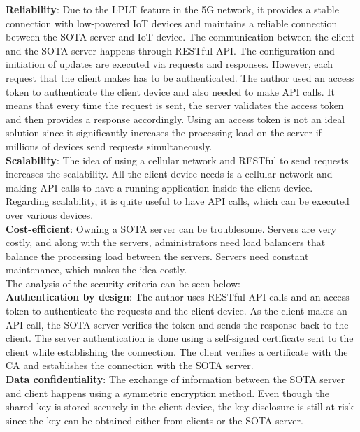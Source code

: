 \documentclass[12pt,a4paper]{article}
\begin{document}
{\textbf{Reliability}: Due to the LPLT feature in the 5G network, it provides a stable connection with low-powered IoT devices and maintains a reliable connection between the SOTA server and IoT device. The communication between the client and the SOTA server happens through RESTful API. The configuration and initiation of updates are executed via requests and responses. However, each request that the client makes has to be authenticated. The author used an access token to authenticate the client device and also needed to make API calls. It means that every time the request is sent, the server validates the access token and then provides a response accordingly. Using an access token is not an ideal solution since it significantly increases the processing load on the server if millions of devices send requests simultaneously. \cite{r28} \\

\textbf{Scalability}: The idea of using a cellular network and RESTful to send requests increases the scalability. All the client device needs is a cellular network and making API calls to have a running application inside the client device. Regarding scalability, it is quite useful to have API calls, which can be executed over various devices. \cite{r28} \\

\textbf{Cost-efficient}: Owning a SOTA server can be troublesome. Servers are very costly, and along with the servers, administrators need load balancers that balance the processing load between the servers. Servers need constant maintenance, which makes the idea costly. \cite{r28} \\

The analysis of the security criteria can be seen below: \\

\textbf{Authentication by design}: The author uses RESTful API calls and an access token to authenticate the requests and the client device. As the client makes an API call, the SOTA server verifies the token and sends the response back to the client. The server authentication is done using a self-signed certificate sent to the client while establishing the connection. The client verifies a certificate with the CA and establishes the connection with the SOTA server. \cite{r28} \\

\textbf{Data confidentiality}: The exchange of information between the SOTA server and client happens using a symmetric encryption method. Even though the shared key is stored securely in the client device, the key disclosure is still at risk since the key can be obtained either from clients or the SOTA server. \cite{r28} \\

}
\end{document}
